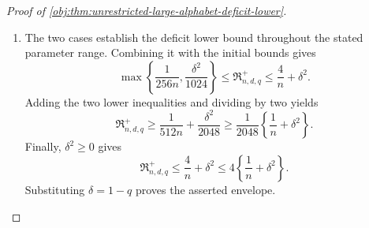\documentclass[11pt]{article}
\begin{document}
\begin{proof}[Proof of \cref{obj:thm:unrestricted-large-alphabet-deficit-lower}]
\begin{enumerate}
Every constructed law belongs to the model class in
\cref{obj:def:unrestricted-arrival-model-class}. The independent fair treatment draw verifies
\cref{obj:ass:randomized-independence,obj:ass:balanced-randomization}, and the defining identities for the realized variables verify
\cref{obj:ass:surrogate-consistency,obj:ass:outcome-consistency}.
Within an occupied cell, the outcome under \(P_\xi\) is deterministic, while under \(P_\star\) its arrival draw is independent of the outcome; these properties verify
\cref{obj:ass:arrival-mar}. For every \(a\in\{0,1\}\) and \(x\in\{0,\ldots,d-1\}\), the cell probabilities of
\cref{obj:synth_16} are
\[
p_{ax0}(P_\xi)=p_{ax0}(P_\star)=\frac1{2d},
\qquad
p_{ax1}(P_\xi)=p_{ax1}(P_\star)=0.
\]
On the occupied cells, their arrival probabilities are
\[
\rho_{ax0}(P_\xi)=1-a\delta\xi_x\ge q,
\qquad
\rho_{ax0}(P_\star)
=
\begin{cases}
1,&a=0,\\
(1+q)/2,&a=1,
\end{cases}
\ge q.
\]
This verifies \cref{obj:ass:occupied-cell-arrival}, and hence
\[
P_\xi,P_\star\in\mathcal M^{+}_{n,d,q}.
\]

Each member-law risk is therefore at most
\(\mathcal R_{\mathrm{sup}}(\mathsf T)\). Since
\(\nu_{\mathrm{cell}}\) is a probability law,
\[
\mathcal R_{\mathrm{prior}}(\mathsf T)
\le
\int\mathcal R_{\mathrm{sup}}(\mathsf T)\,
\nu_{\mathrm{cell}}(d\xi)
=
\mathcal R_{\mathrm{sup}}(\mathsf T),
\qquad
\mathcal R_\star(\mathsf T)
\le\mathcal R_{\mathrm{sup}}(\mathsf T).
\]
It follows that
\[
2\mathcal R_{\mathrm{sup}}(\mathsf T)
\ge
\mathcal R_{\mathrm{prior}}(\mathsf T)+\mathcal R_\star(\mathsf T)
\ge\frac{h_{\mathrm{sep}}^2}{32}.
\]
Using \(h_{\mathrm{sep}}\ge\delta/4\ge0\), we conclude
\[
\mathcal R_{\mathrm{sup}}(\mathsf T)
\ge\frac{h_{\mathrm{sep}}^2}{64}
\ge\frac{\delta^2}{1024}.
\]
This holds for every kernel in the stated decision class. Taking its infimum, as in
\cref{obj:def:unrestricted-minimax-risk}, proves
\[
\frac{\delta^2}{1024}\le\mathfrak R^{+}_{n,d,q}
\]
in the remaining regime. %

\item The two cases establish the deficit lower bound throughout the stated parameter range. Combining it with the initial bounds gives
\[
\max\left\{\frac1{256n},\frac{\delta^2}{1024}\right\}
\le\mathfrak R^{+}_{n,d,q}
\le\frac4n+\delta^2.
\]
Adding the two lower inequalities and dividing by two yields
\[
\mathfrak R^{+}_{n,d,q}
\ge
\frac1{512n}+\frac{\delta^2}{2048}
\ge
\frac1{2048}\left\{\frac1n+\delta^2\right\}.
\]
Finally, \(\delta^2\ge0\) gives
\[
\mathfrak R^{+}_{n,d,q}
\le\frac4n+\delta^2
\le4\left\{\frac1n+\delta^2\right\}.
\]
Substituting \(\delta=1-q\) proves the asserted envelope. %
\end{enumerate}
\end{proof}
\end{document}

